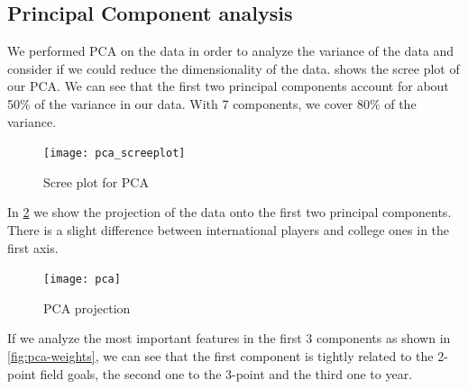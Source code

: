 \subsection{Principal Component analysis}%
\label{sub:pca}

We performed PCA on the data in order to analyze the variance of the data and
consider if we could reduce the dimensionality of the data. 
shows the scree plot of our PCA. We can see that the first two principal
components account for about 50\% of the variance in our data. With 7
components, we cover 80\% of the variance.

\begin{figure}[H]
  \texttt{[image: pca\_screeplot]}
  \caption{Scree plot for PCA}%
  \label{fig:pca-scree}
\end{figure}

In \cref{fig:pca} we show the projection of the data onto the first two principal
components. There is a slight difference between international players and college ones
in the first axis.

\begin{figure}[H]
  \texttt{[image: pca]}
  \caption{PCA projection}%
  \label{fig:pca}
\end{figure}

If we analyze the most important features in the first 3 components as shown in
\cref{fig:pca-weights}, we can see that the first component is tightly related
to the 2-point field goals, the second one to the 3-point and the third one to
year.


